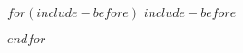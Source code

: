 \documentclass[fontsize=12pt,DIV=10,paper=a4,twoside=false]{scrartcl}
\title{\pstTitel}
\author{\pstVonAutor}
\begin{document}
$for(include-before)$
$include-before$

$endfor$
\end{document}
